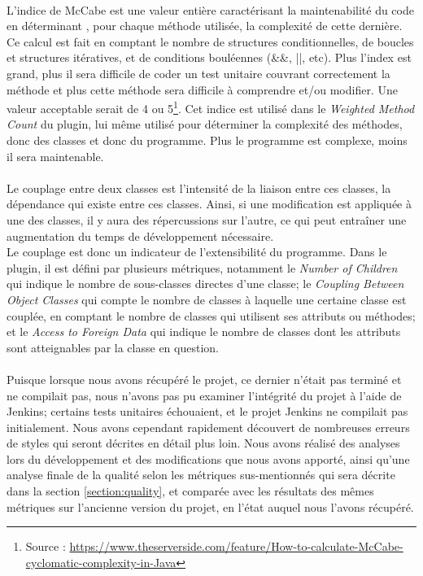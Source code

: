         \paragraph{}
        L'indice de McCabe est une valeur entière caractérisant la maintenabilité du code en déterminant , pour chaque méthode utilisée, la complexité de cette dernière. Ce calcul est fait en comptant le nombre de structures conditionnelles, de boucles et structures itératives, et de conditions bouléennes (\&\&, ||, etc). Plus l'index est grand, plus il sera difficile de coder un test unitaire couvrant correctement la méthode et plus cette méthode sera difficile à comprendre et/ou modifier. Une valeur acceptable serait de 4 ou 5\footnote{Source : \url{https://www.theserverside.com/feature/How-to-calculate-McCabe-cyclomatic-complexity-in-Java}}. Cet indice est utilisé dans le \textit{Weighted Method Count} du plugin, lui même utilisé pour déterminer la complexité des méthodes, donc des classes et donc du programme. Plus le programme est complexe, moins il sera maintenable.
        \paragraph{}
        Le couplage entre deux classes est l'intensité de la liaison entre ces classes, la dépendance qui existe entre ces classes. Ainsi, si une modification est appliquée à une des classes, il y aura des répercussions sur l'autre, ce qui peut entraîner une augmentation du temps de développement nécessaire. \\ 
        Le couplage est donc un indicateur de l'extensibilité du programme. Dans le plugin, il est défini par plusieurs métriques, notamment le \textit{Number of Children} qui indique le nombre de sous-classes directes d'une classe; le \textit{Coupling Between Object Classes} qui compte le nombre de classes à laquelle une certaine classe est couplée, en comptant le nombre de classes qui utilisent ses attributs ou méthodes; et le \textit{Access to Foreign Data} qui indique le nombre de classes dont les attributs sont atteignables par la classe en question. 
        
        \paragraph{}
        Puisque lorsque nous avons récupéré le projet, ce dernier n'était pas terminé et ne compilait pas, nous n'avons pas pu examiner l'intégrité du projet à l'aide de Jenkins; certains tests unitaires échouaient, et le projet Jenkins ne compilait pas initialement. Nous avons cependant rapidement découvert de nombreuses erreurs de styles qui seront décrites en détail plus loin. Nous avons réalisé des analyses lors du développement et des modifications que nous avons apporté, ainsi qu'une analyse finale de la qualité selon les métriques sus-mentionnés qui sera décrite dans la section \ref{section:quality}, et comparée avec les résultats des mêmes métriques sur l'ancienne version du projet, en l'état auquel nous l'avons récupéré.